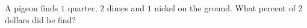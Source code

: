 A pigeon finds $1$ quarter, $2$ dimes and $1$ nickel on the ground. What percent of $2$ dollars did he find?
